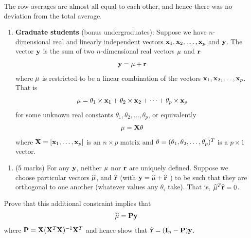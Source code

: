 \documentclass[9pt,letter]{article}
\providecommand{\tightlist}{%
  \setlength{\itemsep}{0pt}\setlength{\parskip}{0pt}}
\begin{document}
The row averages are almost all equal to each other, and hence there was
no deviation from the total average.

\begin{enumerate}
\def\labelenumi{\arabic{enumi}.}
\setcounter{enumi}{5}
\tightlist
\item
  \textbf{Graduate students} (bonus undergraduates): Suppose we have
  \(n\)-dimensional real and linearly independent vectors
  \({\bf x}_1, {\bf x}_2, \ldots , {\bf x}_p\) and \({\bf y}\). The
  vector \({\bf y}\) is the sum of two \(n\)-dimensional real vectors
  \({\bf \mu}\) and \({\bf r}\) \[ {\bf y} = {\bf \mu} + {\bf r} \]
  where \({\bf \mu}\) is restricted to be a linear combination of the
  vectors \({\bf x}_1, {\bf x}_2, \ldots , {\bf x}_p\). That is
  \[ {\bf \mu} = \theta_1 \times {\bf x}_1 + \theta_2 \times {\bf x}_2 + \cdots  + \theta_p \times{\bf x}_p\]
  for some unknown real constants
  \(\theta_1, \theta_2, \ldots, \theta_p\), or equivalently
  \[  {\bf \mu}  = {\bf X}{\bf \theta}\] where
  \({\bf X} = [ {\bf x}_1, \ldots, {\bf x}_p]\) is an \(n \times p\)
  matrix and \({\bf \theta} = (\theta_1, \theta_2, \ldots, \theta_p)^T\)
  is a \(p \times 1\) vector.
\end{enumerate}

\begin{enumerate}
\def\labelenumi{(\alph{enumi})}
\tightlist
\item
  (5 marks) For any \({\bf y}\), neither \({\bf \mu}\) nor \({\bf r}\)
  are uniquely defined. Suppose we choose particular vectors
  \(\widehat{\bf \mu}\), and \(\widehat{\bf r}\) (with
  \({\bf y} = \widehat{\bf \mu} + \widehat{\bf r}~\)) to be such that
  they are orthogonal to one another (whatever values any \(\theta_i\)
  take). That is, \(\widehat{\bf \mu}^T \widehat{\bf r} = 0\).
\end{enumerate}

Prove that this additional constraint implies that
\[\widehat{\bf \mu} = {\bf P} {\bf y} \] where
\({\bf P} = {\bf X} ({\bf X}^T {\bf X})^{-1}{\bf X}^T\) and hence show
that \(\widehat{\bf r} = ({\bf I}_n -{\bf P}){\bf y}\).
\end{document}
